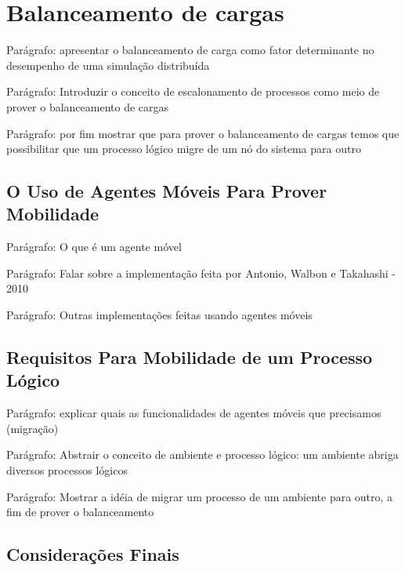 \section{Balanceamento de cargas}

Parágrafo: apresentar o balanceamento de carga como fator determinante no desempenho de uma simulação distribuída

Parágrafo: Introduzir o conceito de escalonamento de processos como meio de prover o balanceamento de cargas

Parágrafo: por fim mostrar que para prover o balanceamento de cargas temos que possibilitar que um processo lógico migre de um nó do sistema para outro

\subsection{O Uso de Agentes Móveis Para Prover Mobilidade}

Parágrafo: O que é um agente móvel

Parágrafo: Falar sobre a implementação feita por Antonio, Walbon e Takahashi - 2010

Parágrafo: Outras implementações feitas usando agentes móveis

\subsection{Requisitos Para Mobilidade de um Processo Lógico}

Parágrafo: explicar quais as funcionalidades de agentes móveis que precisamos (migração)

Parágrafo: Abstrair o conceito de ambiente e processo lógico: um ambiente abriga diversos processos lógicos

Parágrafo: Mostrar a idéia de migrar um processo de um ambiente para outro, a fim de prover o balanceamento

\subsection{Considerações Finais}
